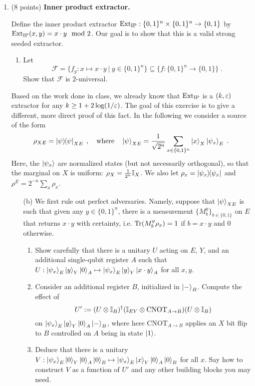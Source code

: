 \documentclass[12pt]{article}
\begin{document}
\begin{enumerate}
\item (8 points) {\bf Inner product extractor.}

Define the inner product extractor $\mathrm{Ext}_{\mathrm{IP}}:\{0,1\}^n\times\{0,1\}^n\to\{0,1\}$ by $\mathrm{Ext}_{\mathrm{IP}}(x,y)=x\cdot y\mod 2$. Our goal is to show that this is a valid strong seeded extractor. 
\begin{enumerate}
\item Let 
\[\mathcal{F}=\big\{f_y:x\mapsto x\cdot y \ | \ y\in\{0,1\}^n\big\}\subseteq \big\{ f: \{0,1\}^n\to\{0,1\}\big\}\;.\]
Show that $\mathcal{F}$ is $2$-universal.
\end{enumerate}
Based on the work done in class, we already know that $\mathrm{Ext}_{\mathrm{IP}}$ is a $(k,\varepsilon)$ extractor for any $k\geq 1+2\log(1/\varepsilon)$. The goal of this exercise is to give a different, more direct proof of this fact. In the following we consider a source of the form
\[\rho_{XE}=\ket{\psi}\!\!\bra{\psi}_{XE}\;, \quad\text{where}\quad \ket{\psi}_{XE}=\frac{1}{\sqrt{2^n}} \sum_{x\in\{0,1\}^n} \ket{x}_X\ket{\psi_x}_E\;.\]
Here, the $\ket{\psi_x}$ are normalized states (but not necessarily orthogonal), so that the marginal on $X$ is uniform: $\rho_X= \frac{1}{2^n}\mathbb{I}_X$. We also let $\rho_x = \ket{\psi_x}\!\!\bra{\psi_x}$ and $\rho^E = 2^{-n}\sum_x \rho_x$. 
\begin{enumerate}
\item[(b)] We first rule out perfect adversaries. Namely, suppose that $\ket{\psi}_{XE}$ is such that given any $y\in\{0,1\}^n$, there is a measurement $\{M^y_b\}_{b\in\{0,1\}}$ on $E$ that returns $x\cdot y$ with certainty, i.e. $\mathrm{Tr}(M^y_{b} \rho_x)=1$ if $b=x\cdot y$ and $0$ otherwise. 
 \begin{enumerate}
\item Show carefully that there is a unitary $U$ acting on $E$, $Y$, and an additional single-qubit register $A$ such that $U:\ket{\psi_x}_E\ket{y}_Y\ket{0}_A \mapsto \ket{\psi_x}_E\ket{y}_Y\ket{x\cdot y}_A$ for all $x,y$.
\item Consider an additional register $B$, initialized in $\ket{-}_B$. Compute the effect of  
\[  U':=(U\otimes \mathbb{I}_B)^\dagger (\mathbb{I}_{EY}\otimes \mathrm{CNOT}_{A\to B})(U\otimes \mathbb{I}_{B})\]
 on $\ket{\psi_x}_E\ket{y}_Y\ket{0}_A\ket{-}_B$, where here  $\mathrm{CNOT}_{A\to B}$ applies an $X$ bit flip to $B$ controlled on $A$ being in state $\ket{1}$.
\item Deduce that there is a unitary $V: \ket{\psi_x}_E\ket{0}_Y\ket{0}_A\ket{0}_B\mapsto \ket{\psi_x}_E\ket{x}_Y\ket{0}_A\ket{0}_B$ for all $x$. Say how to construct $V$ as a function of $U'$ and any other building blocks you may need. 

\end{enumerate}
\end{enumerate}
\end{enumerate}
\end{document}
